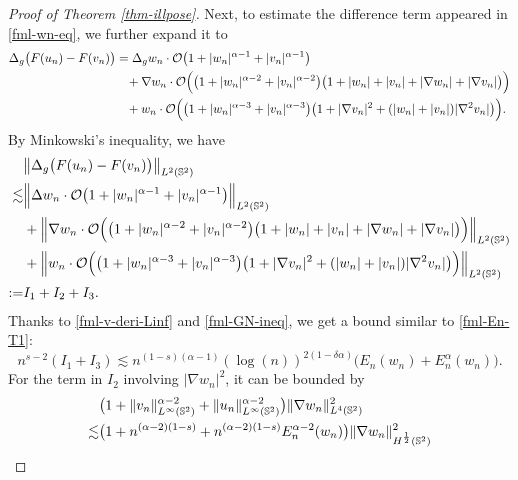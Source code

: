 \documentclass[11pt, reqno]{amsart}
\numberwithin{equation}{section}
\theoremstyle{definition}
\theoremstyle{remark}
\begin{document}
\begin{proof}[Proof of Theorem \ref{thm-illpose}]
Next, to estimate the difference term appeared in \eqref{fml-wn-eq}, we further expand it to 
\begin{equation*}
\begin{aligned}
\Delta_g \big(F(u_n)-F(v_n)\big) &= \Delta_g w_n \cdot \mathcal{O}\big( 1+|w_n|^{\alpha-1}+|v_n|^{\alpha-1} \big)\\
&\hspace{2ex}+ \nabla w_n \cdot \mathcal{O}\Big( \big( 1+|w_n|^{\alpha-2}+|v_n|^{\alpha-2} \big) \big( 1+|w_n|+|v_n|+|\nabla w_n|+|\nabla v_n| \big) \Big)\\
&\hspace{2ex}+ w_n \cdot \mathcal{O}\Big( \big( 1+|w_n|^{\alpha-3}+|v_n|^{\alpha-3} \big) \big( 1+|\nabla v_n|^2+(|w_n|+|v_n|)|\nabla^2 v_n| \big) \Big).
\end{aligned}
\end{equation*}
By Minkowski's inequality, we have 
\begin{equation*}
\begin{aligned}
&\big\|\Delta_g \big(F(u_n)-F(v_n)\big) \big\|_{L^2(\Bbb S^2)}\\
\lesssim& \Big\|\Delta w_n \cdot \mathcal{O}\big( 1+|w_n|^{\alpha-1}+|v_n|^{\alpha-1} \big) \Big\|_{L^2(\Bbb S^2)}\\
&+ \Big\|\nabla w_n \cdot \mathcal{O}\Big( \big( 1+|w_n|^{\alpha-2}+|v_n|^{\alpha-2} \big) \big( 1+|w_n|+|v_n|+|\nabla w_n|+|\nabla v_n| \big) \Big) \Big\|_{L^2(\Bbb S^2)}\\
&+ \Big\|w_n\cdot\mathcal{O}\Big( \big( 1+|w_n|^{\alpha-3}+|v_n|^{\alpha-3} \big) \big( 1+|\nabla v_n|^2+(|w_n|+|v_n|)|\nabla^2 v_n| \big) \Big)\Big\|_{L^2(\Bbb S^2)}\\
:=& I_1+I_2+I_3.
\end{aligned}
\end{equation*}
Thanks to \eqref{fml-v-deri-Linf} and \eqref{fml-GN-ineq}, we get a   bound similar  to \eqref{fml-En-T1}:
\begin{equation*}
n^{s-2}(I_1+I_3) \lesssim n^{(1-s)(\alpha-1)}(\log(n))^{2(1-\delta \alpha)} \big( E_n(w_n) + E^\alpha_n(w_n) \big).
\end{equation*}
For the term in $I_2$ involving $|\nabla w_n|^2$, it can be bounded by
\begin{equation*}
\begin{aligned}
&\big( 1 + \|v_n\|^{\alpha-2}_{L^\infty(\Bbb S^2)} + \|u_n\|^{\alpha-2}_{L^\infty(\Bbb S^2)} \big) \|\nabla w_n\|_{L^4(\Bbb S^2)}^2\\
\lesssim& \big( 1+n^{(\alpha-2)(1-s)}+n^{(\alpha-2)(1-s)} E^{\alpha-2}_n(w_n) \big) \|\nabla w_n\|^2_{H^{\frac{1}{2}}(\Bbb S^2)} \\

\end{aligned}
\end{equation*}
\end{proof}
\end{document}
